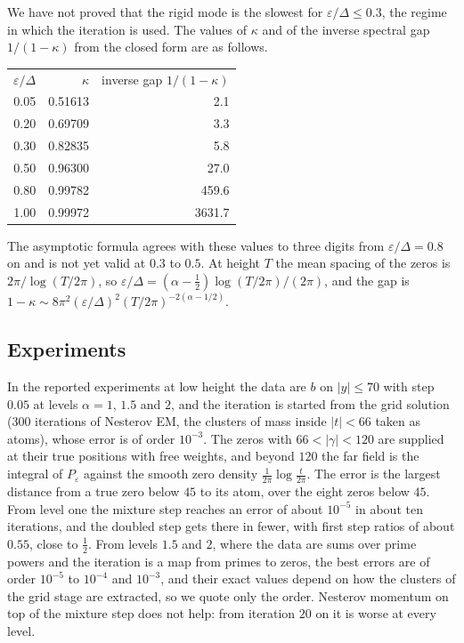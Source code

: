 We have not proved that the rigid mode is the slowest for $\varepsilon/\Delta\le0.3$, the regime in which the iteration is used. The values of $\kappa$ and of the inverse spectral gap $1/(1-\kappa)$ from the closed form are as follows.

\begin{center}
\begin{tabular}{rrr}
$\varepsilon/\Delta$ & $\kappa$ & inverse gap $1/(1-\kappa)$\\
0.05 & 0.51613 & 2.1\\
0.20 & 0.69709 & 3.3\\
0.30 & 0.82835 & 5.8\\
0.50 & 0.96300 & 27.0\\
0.80 & 0.99782 & 459.6\\
1.00 & 0.99972 & 3631.7
\end{tabular}
\end{center}

The asymptotic formula agrees with these values to three digits from $\varepsilon/\Delta=0.8$ on and is not yet valid at $0.3$ to $0.5$. At height $T$ the mean spacing of the zeros is $2\pi/\log(T/2\pi)$, so $\varepsilon/\Delta=(\alpha-\frac12)\log(T/2\pi)/(2\pi)$, and the gap is $1-\kappa\sim8\pi^2(\varepsilon/\Delta)^2(T/2\pi)^{-2(\alpha-1/2)}$.

\subsection{Experiments}\label{qt:sec:exp}

In the reported experiments at low height the data are $b$ on $|y|\le70$ with step $0.05$ at levels $\alpha=1$, $1.5$ and $2$, and the iteration is started from the grid solution (300 iterations of Nesterov EM, the clusters of mass inside $|t|<66$ taken as atoms), whose error is of order $10^{-3}$. The zeros with $66<|\gamma|<120$ are supplied at their true positions with free weights, and beyond $120$ the far field is the integral of $P_\varepsilon$ against the smooth zero density $\frac1{2\pi}\log\frac t{2\pi}$. The error is the largest distance from a true zero below $45$ to its atom, over the eight zeros below $45$. From level one the mixture step reaches an error of about $10^{-5}$ in about ten iterations, and the doubled step gets there in fewer, with first step ratios of about $0.55$, close to $\frac12$. From levels $1.5$ and $2$, where the data are sums over prime powers and the iteration is a map from primes to zeros, the best errors are of order $10^{-5}$ to $10^{-4}$ and $10^{-3}$, and their exact values depend on how the clusters of the grid stage are extracted, so we quote only the order. Nesterov momentum on top of the mixture step does not help: from iteration $20$ on it is worse at every level.

